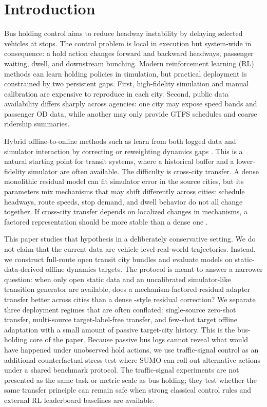 \section{Introduction}

Bus holding control aims to reduce headway instability by delaying selected vehicles at stops.
The control problem is local in execution but system-wide in consequence: a hold action changes forward and backward headways, passenger waiting, dwell, and downstream bunching.
Modern reinforcement learning (RL) methods can learn holding policies in simulation, but practical deployment is constrained by two persistent gaps.
First, high-fidelity simulation and manual calibration are expensive to reproduce in each city.
Second, public data availability differs sharply across agencies: one city may expose speed bands and passenger OD data, while another may only provide GTFS schedules and coarse ridership summaries.

Hybrid offline-to-online methods such as \Htwo learn from both logged data and simulator interaction by correcting or reweighting dynamics gaps \citep{niu2022h2o,liu2024h2oplus}.
This is a natural starting point for transit systems, where a historical buffer and a lower-fidelity simulator are often available.
The difficulty is cross-city transfer.
A dense monolithic residual model can fit simulator error in the source cities, but its parameters mix mechanisms that may shift differently across cities: schedule headways, route speeds, stop demand, and dwell behavior do not all change together.
If cross-city transfer depends on localized changes in mechanisms, a factored representation should be more stable than a dense one \citep{bengio2020meta,feng2022factored}.

This paper studies that hypothesis in a deliberately conservative setting.
We do not claim that the current data are vehicle-level real-world trajectories.
Instead, we construct full-route open transit city bundles and evaluate models on static-data-derived offline dynamics targets.
The protocol is meant to answer a narrower question: when only open static data and an uncalibrated simulator-like transition generator are available, does a mechanism-factored residual adapter transfer better across cities than a dense \Htwo-style residual correction?
We separate three deployment regimes that are often conflated: single-source zero-shot transfer, multi-source target-label-free transfer, and few-shot target offline adaptation with a small amount of passive target-city history.
This is the bus-holding core of the paper.
Because passive bus logs cannot reveal what would have happened under unobserved hold actions, we use traffic-signal control as an additional counterfactual stress test where SUMO can roll out alternative actions under a shared benchmark protocol.
The traffic-signal experiments are not presented as the same task or metric scale as bus holding; they test whether the same transfer principle can remain safe when strong classical control rules and external RL leaderboard baselines are available.

